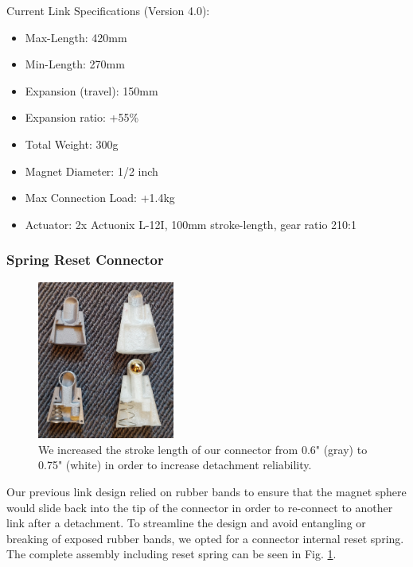 \documentclass[letterpaper, 10 pt, conference]{ieeeconf}  %
\begin{document}
Current Link Specifications (Version 4.0):
\begin{itemize}
\item Max-Length: 420mm
\item Min-Length: 270mm
\item Expansion (travel): 150mm
\item Expansion ratio: +55\% 
\item Total Weight: 300g
\item Magnet Diameter: 1/2 inch
\item Max Connection Load: +1.4kg
\item Actuator: 2x Actuonix L-12I, 100mm stroke-length, gear ratio 210:1
\end{itemize}


\subsubsection{Spring Reset Connector}

 \begin{figure}
\centering
\includegraphics[width=0.4\textwidth]{media/openConnectorPrototype.jpg}
   \caption{\label{openConnector}  We increased the stroke length of our connector from 0.6" (gray) to 0.75" (white) in order to increase detachment reliability.}
\end{figure}

Our previous link design relied on rubber bands to ensure that the magnet sphere would slide back into the tip of the connector in order to re-connect to another link after a detachment. To streamline the design and avoid entangling or breaking of exposed rubber bands, we opted for a connector internal reset spring. The complete assembly including reset spring can be seen in Fig. \ref{openConnector}.
\end{document}
